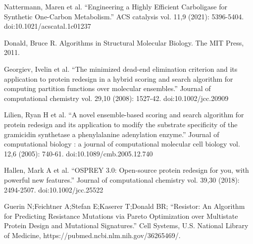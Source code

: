 \documentclass[12pt]{extarticle}
\begin{document}
\begin{thebibliography}{1}

 Nattermann, Maren et al. “Engineering a Highly Efficient Carboligase for Synthetic One-Carbon Metabolism.” ACS catalysis vol. 11,9 (2021): 5396-5404. doi:10.1021/acscatal.1c01237

 Donald, Bruce R. Algorithms in Structural Molecular Biology. The MIT Press, 2011.

 Georgiev, Ivelin et al. “The minimized dead-end elimination criterion and its application to protein redesign in a hybrid scoring and search algorithm for computing partition functions over molecular ensembles.” Journal of computational chemistry vol. 29,10 (2008): 1527-42. doi:10.1002/jcc.20909

Lilien, Ryan H et al. “A novel ensemble-based scoring and search algorithm for protein redesign and its application to modify the substrate specificity of the gramicidin synthetase a phenylalanine adenylation enzyme.” Journal of computational biology : a journal of computational molecular cell biology vol. 12,6 (2005): 740-61. doi:10.1089/cmb.2005.12.740

Hallen, Mark A et al. “OSPREY 3.0: Open-source protein redesign for you, with powerful new features.” Journal of computational chemistry vol. 39,30 (2018): 2494-2507. doi:10.1002/jcc.25522

Guerin N;Feichtner A;Stefan E;Kaserer T;Donald BR; “Resistor: An Algorithm for Predicting Resistance Mutations via Pareto Optimization over Multistate Protein Design and Mutational Signatures.” Cell Systems, U.S. National Library of Medicine, https://pubmed.ncbi.nlm.nih.gov/36265469/. 



\end{thebibliography}
\end{document}
